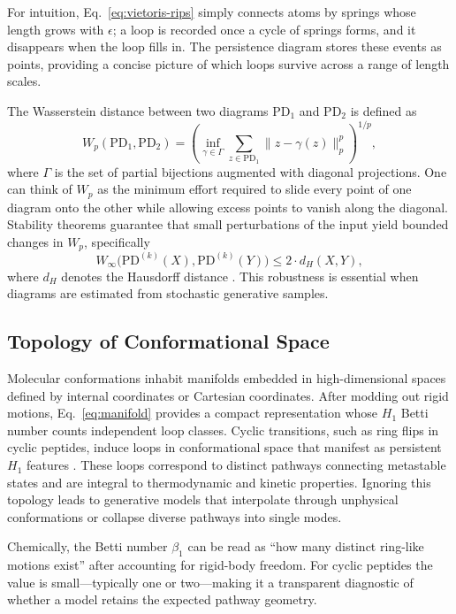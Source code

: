 \documentclass[11pt]{article}
\begin{document}
For intuition, Eq.~\eqref{eq:vietoris-rips} simply connects atoms by springs whose length grows with $\epsilon$; a loop is recorded once a cycle of springs forms, and it disappears when the loop fills in. The persistence diagram stores these events as points, providing a concise picture of which loops survive across a range of length scales.

The Wasserstein distance between two diagrams $\mathrm{PD}_1$ and $\mathrm{PD}_2$ is defined as
\begin{equation}
    W_p(\mathrm{PD}_1, \mathrm{PD}_2) = \left( \inf_{\gamma \in \Gamma} \sum_{z \in \mathrm{PD}_1} \| z - \gamma(z) \|_p^p \right)^{1/p},
    \label{eq:wasserstein}
\end{equation}
where $\Gamma$ is the set of partial bijections augmented with diagonal projections. One can think of $W_p$ as the minimum effort required to slide every point of one diagram onto the other while allowing excess points to vanish along the diagonal. Stability theorems guarantee that small perturbations of the input yield bounded changes in $W_p$, specifically
\begin{equation}
    W_\infty\big( \mathrm{PD}^{(k)}(X), \mathrm{PD}^{(k)}(Y) \big) \leq 2 \cdot d_H(X, Y),
    \label{eq:stability}
\end{equation}
where $d_H$ denotes the Hausdorff distance \cite{cohen2007stability, chazal2016structure}. This robustness is essential when diagrams are estimated from stochastic generative samples.

\subsection{Topology of Conformational Space}
Molecular conformations inhabit manifolds embedded in high-dimensional spaces defined by internal coordinates or Cartesian coordinates. After modding out rigid motions, Eq.~\eqref{eq:manifold} provides a compact representation whose $H_1$ Betti number counts independent loop classes. Cyclic transitions, such as ring flips in cyclic peptides, induce loops in conformational space that manifest as persistent $H_1$ features \cite{wales2001microscopic, shaw2010atomic}. These loops correspond to distinct pathways connecting metastable states and are integral to thermodynamic and kinetic properties. Ignoring this topology leads to generative models that interpolate through unphysical conformations or collapse diverse pathways into single modes.

Chemically, the Betti number $\beta_1$ can be read as ``how many distinct ring-like motions exist'' after accounting for rigid-body freedom. For cyclic peptides the value is small---typically one or two---making it a transparent diagnostic of whether a model retains the expected pathway geometry.
\end{document}

